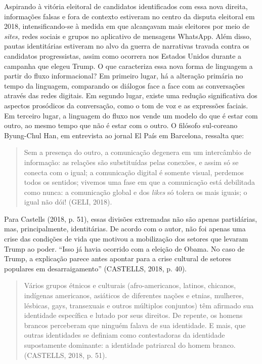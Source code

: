 Aspirando à vitória eleitoral de candidatos identificados com essa nova
direita, informações falsas e fora de contexto estiveram no centro da
disputa eleitoral em 2018, intensificando-se à medida em que alcançavam
mais eleitores por meio de \emph{sites,} redes sociais e grupos no
aplicativo de mensagens WhatsApp. Além disso, pautas identitárias
estiveram no alvo da guerra de narrativas travada contra os candidatos
progressistas, assim como ocorrera nos Estados Unidos durante a campanha
que elegeu Trump. O que caracteriza essa nova forma de linguagem a
partir do fluxo informacional? Em primeiro lugar, há a alteração
primária no tempo da linguagem, comparando os diálogos face a face com
as conversações através das redes digitais. Em segundo lugar, existe uma
redução significativa dos aspectos prosódicos da conversação, como o tom
de voz e as expressões faciais. Em terceiro lugar, a linguagem do fluxo
nos vende um modelo do que é estar com outro, ao mesmo tempo que não é
estar com o outro. O filósofo sul-coreano Byung-Chul Han, em entrevista
ao jornal El País em Barcelona, ressalta que:

\begin{quote}
Sem a presença do outro, a comunicação degenera em um intercâmbio de
informação: as relações são substituídas pelas conexões, e assim só se
conecta com o igual; a comunicação digital é somente visual, perdemos
todos os sentidos; vivemos uma fase em que a comunicação está debilitada
como nunca: a comunicação global e dos \emph{likes} só tolera os mais
iguais; o igual não dói! (GELI, 2018).
\end{quote}

Para Castells (2018, p. 51), essas divisões extremadas não são apenas
partidárias, mas, principalmente, identitárias. De acordo com o autor,
não foi apenas uma crise das condições de vida que motivou a mobilização
dos setores que levaram Trump ao poder. ``Isso já havia ocorrido com a
eleição de Obama. No caso de Trump, a explicação parece antes apontar
para a crise cultural de setores populares em desarraigamento''
(CASTELLS, 2018, p. 40).

\begin{quote}
Vários grupos étnicos e culturais (afro-americanos, latinos, chicanos,
indígenas americanos, asiáticos de diferentes nações e etnias, mulheres,
lésbicas, gays, transexuais e outros múltiplos conjuntos) têm afirmado
sua identidade específica e lutado por seus direitos. De repente, os
homens brancos perceberam que ninguém falava de sua identidade. E mais,
que outras identidades se definiam como contestadoras da identidade
supostamente dominante: a identidade patriarcal do homem branco.
(CASTELLS, 2018, p. 51).
\end{quote}

